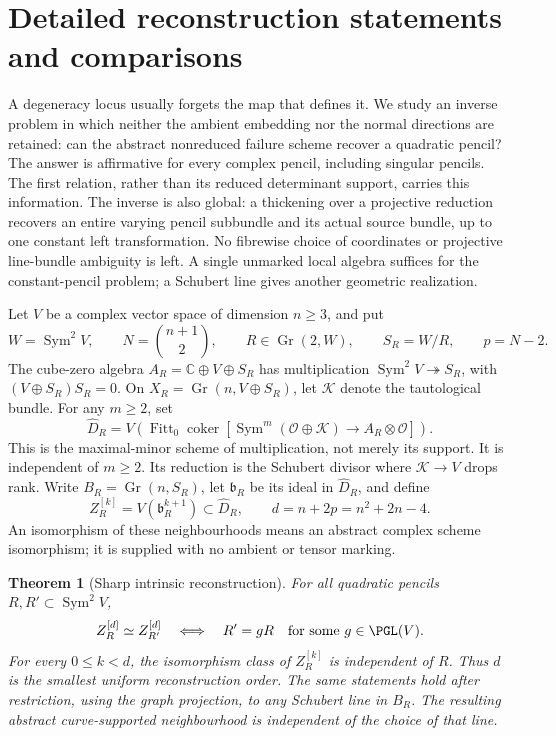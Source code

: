 \documentclass[11pt,reqno]{amsart}
\numberwithin{equation}{section}
\newtheorem{theorem}{Theorem}[section]
\theoremstyle{definition}\newtheorem{definition}[theorem]{Definition}
\theoremstyle{remark}\newtheorem{remark}[theorem]{Remark}
\newcommand{\C}{\mathbb C}\newcommand{\Q}{\mathbb Q}
\newcommand{\OO}{\mathcal O}\newcommand{\II}{\mathcal I}
\DeclareMathOperator{\Sym}{Sym}\DeclareMathOperator{\Gr}{Gr}
\DeclareMathOperator{\Fitt}{Fitt}\DeclareMathOperator{\Ann}{Ann}
\DeclareMathOperator{\coker}{coker}\DeclareMathOperator{\codim}{codim}
\begin{document}
\appendix

\section{Detailed reconstruction statements and comparisons}
\label{sec:introduction-v132}

A degeneracy locus usually forgets the map that defines it.  We study
an inverse problem in which neither the ambient embedding nor the
normal directions are retained: can the abstract nonreduced failure
scheme recover a quadratic pencil?  The answer is affirmative for
every complex pencil, including singular pencils.  The first relation, rather than its reduced determinant support,
carries this information.  The inverse is also global: a thickening over a projective reduction
recovers an entire varying pencil subbundle and its actual source
bundle, up to one constant left transformation.  No fibrewise choice
of coordinates or projective line-bundle ambiguity is left.  A
single unmarked local algebra suffices for the constant-pencil
problem; a Schubert line gives another geometric realization.

Let \(V\) be a complex vector space of dimension \(n\ge3\), and put
\[
 W=\Sym^2V,\qquad N=\binom{n+1}{2},\qquad
 R\in\Gr(2,W),\qquad S_R=W/R,\qquad p=N-2.
\]
The cube-zero algebra \(A_R=\C\oplus V\oplus S_R\) has multiplication
\(\Sym^2V\twoheadrightarrow S_R\), with
\((V\oplus S_R)S_R=0\).  On \(X_R=\Gr(n,V\oplus S_R)\), let
\(\mathcal K\) denote the tautological bundle.  For any \(m\ge2\), set
\begin{equation}\label{eq:failure-intro}
 \widehat D_R=V\!\left(\Fitt_0\coker[
 \Sym^m(\OO\oplus\mathcal K)\longrightarrow A_R\otimes\OO]\right).
\end{equation}
This is the maximal-minor scheme of multiplication, not merely its
support.  It is independent of \(m\ge2\).  Its reduction is the
Schubert divisor where \(\mathcal K\to V\) drops rank.  Write
\(B_R=\Gr(n,S_R)\), let \(\mathfrak b_R\) be its ideal in
\(\widehat D_R\), and define
\[
 Z_R^{[k]}=V(\mathfrak b_R^{k+1})\subset\widehat D_R,
       \qquad d=n+2p=n^2+2n-4.
\]
An isomorphism of these neighbourhoods means an abstract complex
scheme isomorphism; it is supplied with no ambient or tensor marking.

\begin{theorem}[Sharp intrinsic reconstruction]
\label{thm:principal-finite-v143}
For all quadratic pencils \(R,R'\subset\Sym^2V\),
\[
 Z_R^{[d]}\simeq Z_{R'}^{[d]}
       \quad\Longleftrightarrow\quad
 R'=gR\quad\text{for some }g\in\PGL(V).
\]
For every \(0\le k<d\), the isomorphism class of \(Z_R^{[k]}\)
is independent of \(R\).  Thus \(d\) is the smallest uniform
reconstruction order.  The same statements hold after restriction,
using the graph projection, to any Schubert line in \(B_R\).
The resulting abstract curve-supported neighbourhood is independent
of the choice of that line.
\end{theorem}
\end{document}
